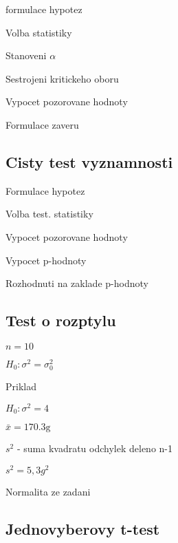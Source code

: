 \documentclass{article}
\begin{document}
formulace hypotez

Volba statistiky

Stanoveni $\alpha$

Sestrojeni kritickeho oboru

Vypocet pozorovane hodnoty

Formulace zaveru

\subsection{Cisty test vyznamnosti}

Formulace hypotez

Volba test. statistiky

Vypocet pozorovane hodnoty

Vypocet p-hodnoty

Rozhodnuti na zaklade p-hodnoty

\subsection{Test o rozptylu}

$n=10$

$H_0: \sigma^2 = \sigma^2_0$

Priklad

$H_0: \sigma^2 = 4$

$\bar{x} = 170.3 \text{g}$

$s^2$ - suma kvadratu odchylek deleno n-1

$s^2 = 5,3 g^2$

Normalita ze zadani

\subsection{Jednovyberovy t-test}
\end{document}
